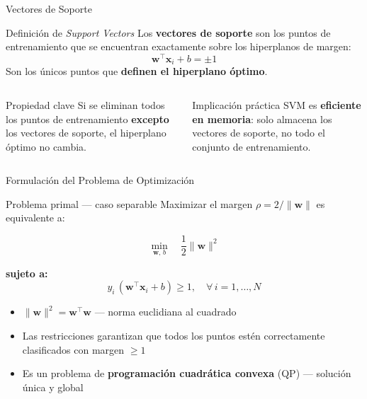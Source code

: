 \documentclass[aspectratio=169,xcolor=dvipsnames]{beamer}
\begin{document}
\begin{frame}{Vectores de Soporte}
    \begin{block}{Definición de \textit{Support Vectors}}
        Los \textbf{vectores de soporte} son los puntos de entrenamiento que se encuentran exactamente sobre los hiperplanos de margen:
        \begin{equation}
            \mathbf{w}^\top \mathbf{x}_i + b = \pm 1
        \end{equation}
        Son los únicos puntos que \textbf{definen el hiperplano óptimo}.
    \end{block}

    \vspace{0.3em}

    \begin{columns}
        \begin{exampleblock}{Propiedad clave}
            Si se eliminan todos los puntos de entrenamiento \textbf{excepto} los vectores de soporte, el hiperplano óptimo no cambia.
        \end{exampleblock}

        \begin{alertblock}{Implicación práctica}
            SVM es \textbf{eficiente en memoria}: solo almacena los vectores de soporte, no todo el conjunto de entrenamiento.
        \end{alertblock}
    \end{columns}
\end{frame}

\begin{frame}{Formulación del Problema de Optimización}
    \begin{block}{Problema primal — caso separable}
        Maximizar el margen $\rho = 2/\|\mathbf{w}\|$ es equivalente a:
    \end{block}

    \begin{equation}
        \min_{\mathbf{w},\,b} \quad \frac{1}{2}\|\mathbf{w}\|^2
    \end{equation}

    \textbf{sujeto a:}
    \begin{equation}
        y_i \, (\mathbf{w}^\top \mathbf{x}_i + b) \geq 1, \quad \forall \, i = 1, \ldots, N
    \end{equation}

    \begin{itemize}
        \item $\|\mathbf{w}\|^2 = \mathbf{w}^\top \mathbf{w}$ — norma euclidiana al cuadrado
        \item Las restricciones garantizan que todos los puntos estén correctamente clasificados con margen $\geq 1$
        \item Es un problema de \textbf{programación cuadrática convexa} (QP) — solución única y global
    \end{itemize}
\end{frame}
\end{document}
